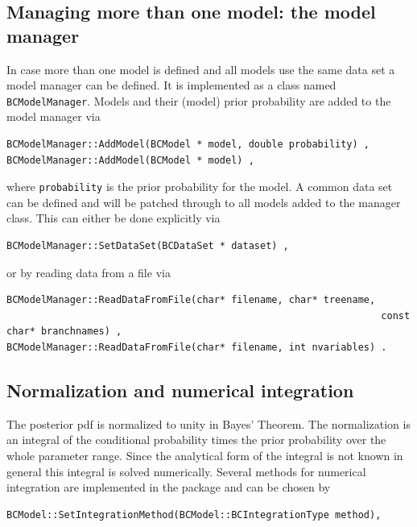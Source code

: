 \documentclass[11pt, a4paper]{article}
\begin{document}

\subsection{Managing more than one model: the model manager}
\label{subsection:modelmanager}

In case more than one model is defined and all models use the same
data set a model manager can be defined. It is implemented as a class
named \verb|BCModelManager|. Models and their (model) prior
probability are added to the model manager via
%
\begin{verbatim}
BCModelManager::AddModel(BCModel * model, double probability) ,
BCModelManager::AddModel(BCModel * model) ,
\end{verbatim}

\noindent
where \verb|probability| is the prior probability for the model. A
common data set can be defined and will be patched through to all
models added to the manager class. This can either be done explicitly
via
%
\begin{verbatim}
BCModelManager::SetDataSet(BCDataSet * dataset) ,
\end{verbatim}

\noindent
or by reading data from a file via
%
\begin{verbatim}
BCModelManager::ReadDataFromFile(char* filename, char* treename,
																 const char* branchnames) ,
BCModelManager::ReadDataFromFile(char* filename, int nvariables) .
\end{verbatim}


\subsection{Normalization and numerical integration}
\label{section:normalization}

The posterior pdf is normalized to unity in Bayes' Theorem. The
normalization is an integral of the conditional probability times the
prior probability over the whole parameter range. Since the analytical
form of the integral is not known in general this integral is solved
numerically. Several methods for numerical integration are implemented
in the package and can be chosen by
%
\begin{verbatim}
BCModel::SetIntegrationMethod(BCModel::BCIntegrationType method),
\end{verbatim}
\end{document}
